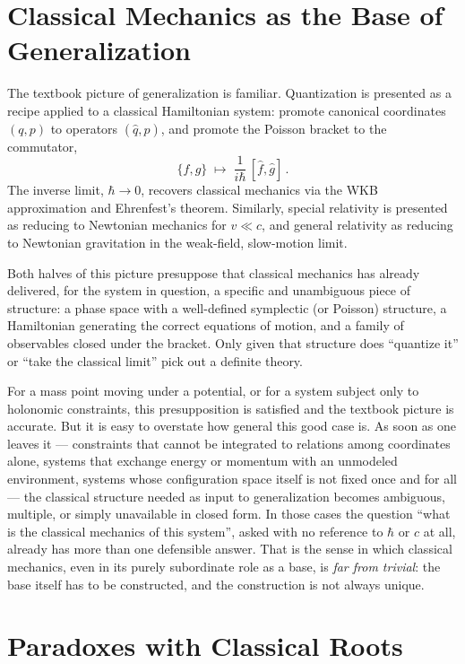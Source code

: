 \section{Classical Mechanics as the Base of Generalization}
\label{tr:ba}

The textbook picture of generalization is familiar. Quantization is presented as
a recipe applied to a classical Hamiltonian system: promote canonical coordinates
$(q,p)$ to operators $(\hat q,\hat p)$, and promote the Poisson bracket to the
commutator,
\begin{equation}
  \{f,g\} \;\longmapsto\; \frac{1}{i\hbar}\,[\hat f,\hat g] \, .
\end{equation}
The inverse limit, $\hbar \to 0$, recovers classical mechanics via the WKB
approximation and Ehrenfest's theorem. Similarly, special relativity is presented
as reducing to Newtonian mechanics for $v \ll c$, and general relativity as
reducing to Newtonian gravitation in the weak-field, slow-motion limit.

Both halves of this picture presuppose that classical mechanics has already
delivered, for the system in question, a specific and unambiguous piece of
structure: a phase space with a well-defined symplectic (or Poisson) structure,
a Hamiltonian generating the correct equations of motion, and a family of
observables closed under the bracket. Only given that structure does
``quantize it'' or ``take the classical limit'' pick out a definite theory.

For a mass point moving under a potential, or for a system subject only to
holonomic constraints, this presupposition is satisfied and the textbook picture
is accurate. But it is easy to overstate how general this good case is. As soon
as one leaves it --- constraints that cannot be integrated to relations among
coordinates alone, systems that exchange energy or momentum with an unmodeled
environment, systems whose configuration space itself is not fixed once and for
all --- the classical structure needed as input to generalization becomes
ambiguous, multiple, or simply unavailable in closed form. In those cases the
question ``what is the classical mechanics of this system'', asked with no
reference to $\hbar$ or $c$ at all, already has more than one defensible answer.
That is the sense in which classical mechanics, even in its purely subordinate
role as a base, is \emph{far from trivial}: the base itself has to be constructed,
and the construction is not always unique.

\section{Paradoxes with Classical Roots}
\label{tr:pa}

